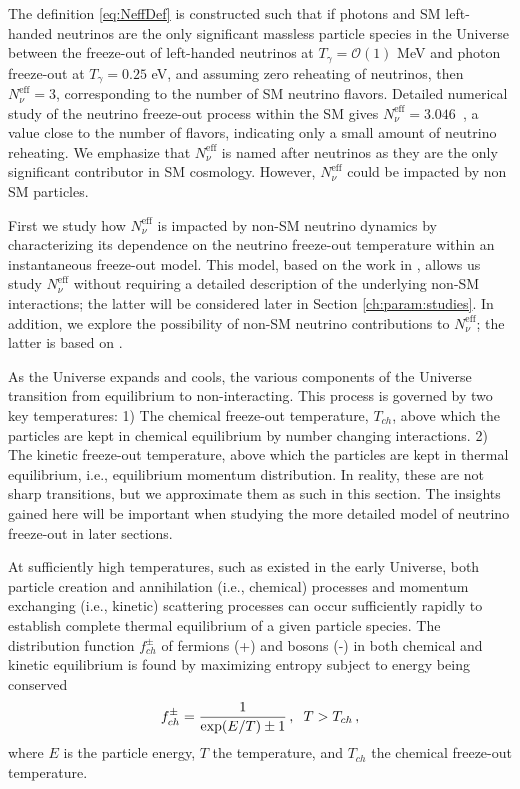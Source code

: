 The definition \eqref{eq:NeffDef} is constructed such that if photons and SM left-handed neutrinos are the only significant massless particle species in the Universe between the freeze-out of left-handed neutrinos at $T_\gamma=\mathcal{O}(1)$ MeV and photon freeze-out at $T_\gamma=0.25$ eV, and assuming zero reheating of neutrinos, then $N^{\text{eff}}_{\nu}=3$, corresponding to the number of SM neutrino flavors. Detailed numerical study of the neutrino freeze-out process within the SM gives $N^{\text{eff}}_{\nu}=3.046$~\cite{Mangano:2005cc}, a value close to the number of flavors, indicating only a small amount of neutrino reheating. 
 We emphasize that $N^{\text{eff}}_\nu$ is named after neutrinos as they are the only significant contributor in SM cosmology. However, $N^{\text{eff}}_\nu$ could be impacted by non SM particles.

First we study how $N^{\text{eff}}_{\nu}$ is impacted by non-SM neutrino dynamics by characterizing its dependence on the neutrino freeze-out temperature within an instantaneous freeze-out model. This model, based on the work in \cite{Birrell:2013gpa,Birrell:2012gg}, allows us study $N^{\text{eff}}_{\nu}$ without requiring a detailed description of the underlying non-SM interactions; the latter will be considered later in Section \ref{ch:param:studies}. In addition, we explore the possibility of non-SM neutrino contributions to $N^{\text{eff}}_\nu$; the latter is based on \cite{Birrell:2014cja}.


As the Universe expands and cools, the various components of the Universe transition from equilibrium to non-interacting. This process is governed by two key temperatures: 1) The chemical freeze-out temperature, $T_{ch}$, above which the particles are kept in chemical equilibrium by number changing interactions. 2) The kinetic freeze-out temperature, above which the particles are kept in thermal equilibrium, i.e., equilibrium momentum distribution. In reality, these are not sharp transitions, but we approximate them as such in this section. The insights gained here will be important when studying the more detailed model of neutrino freeze-out in later sections.

At sufficiently high temperatures, such as existed in the early Universe, both particle creation and annihilation (i.e., chemical) processes and momentum exchanging (i.e., kinetic) scattering processes can occur sufficiently rapidly to establish complete thermal equilibrium of a given particle species. The distribution function $f_{ch}^\pm$ of fermions (+) and bosons (-) in both chemical and kinetic equilibrium is found by maximizing entropy subject to energy being conserved
\begin{equation}\label{eq:ChEq}
f_{ch}^\pm=\frac{1}{\exp(E/T)\pm 1}\,, \hspace{2mm} T>T_{ch}\,,
\end{equation}
where $E$ is the particle energy, $T$ the temperature, and $T_{ch}$ the chemical freeze-out temperature. 

